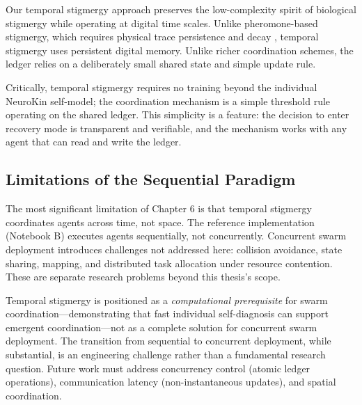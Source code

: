 ﻿\documentclass[12pt,a4paper,oneside]{report}
\begin{document}
\begin{table}[H]
\centering
\caption{Comparison of swarm coordination mechanisms along key scalability and communication axes.}
\label{tab:coordination_comparison}
\end{table}

Our temporal stigmergy approach preserves the low-complexity spirit of biological stigmergy while operating at digital time scales. Unlike pheromone-based stigmergy, which requires physical trace persistence and decay \cite{bongard2006resilient}, temporal stigmergy uses persistent digital memory. Unlike richer coordination schemes, the ledger relies on a deliberately small shared state and simple update rule.

Critically, temporal stigmergy requires no training beyond the individual NeuroKin self-model; the coordination mechanism is a simple threshold rule operating on the shared ledger. This simplicity is a feature: the decision to enter recovery mode is transparent and verifiable, and the mechanism works with any agent that can read and write the ledger.

\subsection{Limitations of the Sequential Paradigm}

The most significant limitation of Chapter 6 is that temporal stigmergy coordinates agents across time, not space. The reference implementation (Notebook B) executes agents sequentially, not concurrently. Concurrent swarm deployment introduces challenges not addressed here: collision avoidance, state sharing, mapping, and distributed task allocation under resource contention. These are separate research problems beyond this thesis's scope.

Temporal stigmergy is positioned as a \textit{computational prerequisite} for swarm coordination---demonstrating that fast individual self-diagnosis can support emergent coordination---not as a complete solution for concurrent swarm deployment. The transition from sequential to concurrent deployment, while substantial, is an engineering challenge rather than a fundamental research question. Future work must address concurrency control (atomic ledger operations), communication latency (non-instantaneous updates), and spatial coordination. 
\end{document}
